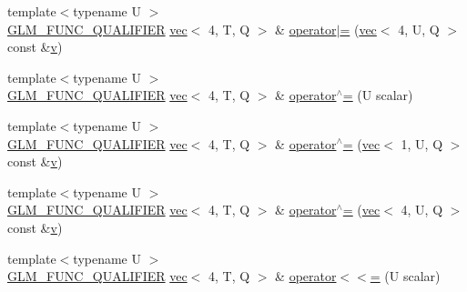 \begin{DoxyCompactItemize}
\item 
{\footnotesize template$<$typename U $>$ }\\\mbox{\hyperlink{setup_8hpp_a33fdea6f91c5f834105f7415e2a64407}{G\+L\+M\+\_\+\+F\+U\+N\+C\+\_\+\+Q\+U\+A\+L\+I\+F\+I\+ER}} \mbox{\hyperlink{structglm_1_1vec}{vec}}$<$ 4, T, Q $>$ \& \mbox{\hyperlink{structglm_1_1vec_3_014_00_01_t_00_01_q_01_4_aea8bc26beedb4f4fbb6a4d0ad4e02a86}{operator$\vert$=}} (\mbox{\hyperlink{structglm_1_1vec}{vec}}$<$ 4, U, Q $>$ const \&\mbox{\hyperlink{_s_d_l__opengl_8h_a10a82eabcb59d2fcd74acee063775f90}{v}})
\item 
{\footnotesize template$<$typename U $>$ }\\\mbox{\hyperlink{setup_8hpp_a33fdea6f91c5f834105f7415e2a64407}{G\+L\+M\+\_\+\+F\+U\+N\+C\+\_\+\+Q\+U\+A\+L\+I\+F\+I\+ER}} \mbox{\hyperlink{structglm_1_1vec}{vec}}$<$ 4, T, Q $>$ \& \mbox{\hyperlink{structglm_1_1vec_3_014_00_01_t_00_01_q_01_4_a123f810174d23a4d1b1eaf299a4e6f51}{operator$^\wedge$=}} (U scalar)
\item 
{\footnotesize template$<$typename U $>$ }\\\mbox{\hyperlink{setup_8hpp_a33fdea6f91c5f834105f7415e2a64407}{G\+L\+M\+\_\+\+F\+U\+N\+C\+\_\+\+Q\+U\+A\+L\+I\+F\+I\+ER}} \mbox{\hyperlink{structglm_1_1vec}{vec}}$<$ 4, T, Q $>$ \& \mbox{\hyperlink{structglm_1_1vec_3_014_00_01_t_00_01_q_01_4_a926de242b3187323bfc98e42863c23d3}{operator$^\wedge$=}} (\mbox{\hyperlink{structglm_1_1vec}{vec}}$<$ 1, U, Q $>$ const \&\mbox{\hyperlink{_s_d_l__opengl_8h_a10a82eabcb59d2fcd74acee063775f90}{v}})
\item 
{\footnotesize template$<$typename U $>$ }\\\mbox{\hyperlink{setup_8hpp_a33fdea6f91c5f834105f7415e2a64407}{G\+L\+M\+\_\+\+F\+U\+N\+C\+\_\+\+Q\+U\+A\+L\+I\+F\+I\+ER}} \mbox{\hyperlink{structglm_1_1vec}{vec}}$<$ 4, T, Q $>$ \& \mbox{\hyperlink{structglm_1_1vec_3_014_00_01_t_00_01_q_01_4_adfc4f1060841f2652c19c17d9980019a}{operator$^\wedge$=}} (\mbox{\hyperlink{structglm_1_1vec}{vec}}$<$ 4, U, Q $>$ const \&\mbox{\hyperlink{_s_d_l__opengl_8h_a10a82eabcb59d2fcd74acee063775f90}{v}})
\item 
{\footnotesize template$<$typename U $>$ }\\\mbox{\hyperlink{setup_8hpp_a33fdea6f91c5f834105f7415e2a64407}{G\+L\+M\+\_\+\+F\+U\+N\+C\+\_\+\+Q\+U\+A\+L\+I\+F\+I\+ER}} \mbox{\hyperlink{structglm_1_1vec}{vec}}$<$ 4, T, Q $>$ \& \mbox{\hyperlink{structglm_1_1vec_3_014_00_01_t_00_01_q_01_4_a2f063a4fd07698015d81f2a66023e021}{operator$<$$<$=}} (U scalar)
\item 

\end{DoxyCompactItemize}
